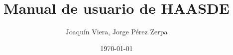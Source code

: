 \documentclass[a4paper,10pt,twocolumn]{article}
\begin{document}
 

\linenumbers

\title{Manual de usuario de HAASDE}
\author{Joaquín Viera, Jorge Pérez Zerpa}
\date{\today}
\maketitle


\end{document}
